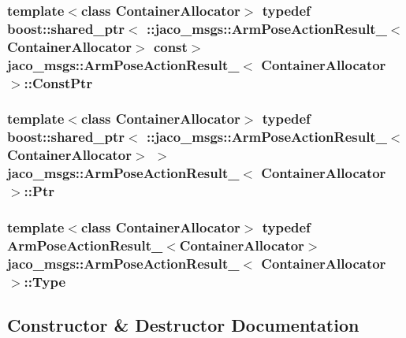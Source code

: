 \subsubsection[{\texorpdfstring{Const\+Ptr}{ConstPtr}}]{\setlength{\rightskip}{0pt plus 5cm}template$<$class Container\+Allocator$>$ typedef boost\+::shared\+\_\+ptr$<$ \+::{\bf jaco\+\_\+msgs\+::\+Arm\+Pose\+Action\+Result\+\_\+}$<$Container\+Allocator$>$ const$>$ {\bf jaco\+\_\+msgs\+::\+Arm\+Pose\+Action\+Result\+\_\+}$<$ Container\+Allocator $>$\+::{\bf Const\+Ptr}}\hypertarget{structjaco__msgs_1_1ArmPoseActionResult___a10c17bbc2a08b9e273ec87170c93f67e}{}\label{structjaco__msgs_1_1ArmPoseActionResult___a10c17bbc2a08b9e273ec87170c93f67e}
\subsubsection[{\texorpdfstring{Ptr}{Ptr}}]{\setlength{\rightskip}{0pt plus 5cm}template$<$class Container\+Allocator$>$ typedef boost\+::shared\+\_\+ptr$<$ \+::{\bf jaco\+\_\+msgs\+::\+Arm\+Pose\+Action\+Result\+\_\+}$<$Container\+Allocator$>$ $>$ {\bf jaco\+\_\+msgs\+::\+Arm\+Pose\+Action\+Result\+\_\+}$<$ Container\+Allocator $>$\+::{\bf Ptr}}\hypertarget{structjaco__msgs_1_1ArmPoseActionResult___afbccfc911b64352d0819c403defeaa7a}{}\label{structjaco__msgs_1_1ArmPoseActionResult___afbccfc911b64352d0819c403defeaa7a}
\subsubsection[{\texorpdfstring{Type}{Type}}]{\setlength{\rightskip}{0pt plus 5cm}template$<$class Container\+Allocator$>$ typedef {\bf Arm\+Pose\+Action\+Result\+\_\+}$<$Container\+Allocator$>$ {\bf jaco\+\_\+msgs\+::\+Arm\+Pose\+Action\+Result\+\_\+}$<$ Container\+Allocator $>$\+::{\bf Type}}\hypertarget{structjaco__msgs_1_1ArmPoseActionResult___af116ac3287100b4a819a2e5f032a55f8}{}\label{structjaco__msgs_1_1ArmPoseActionResult___af116ac3287100b4a819a2e5f032a55f8}


\subsection{Constructor \& Destructor Documentation}
